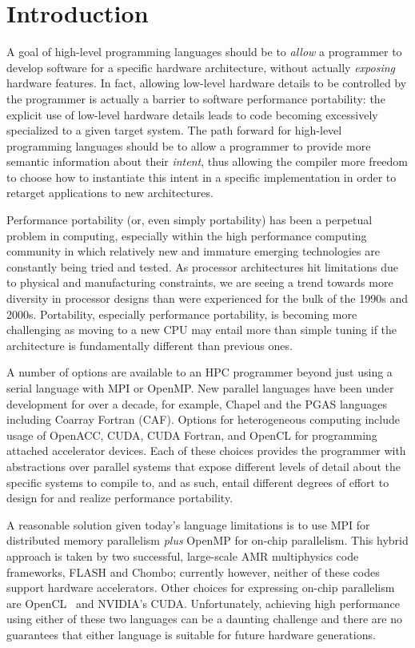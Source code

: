 \section{Introduction}

A goal of high-level programming languages should be to \emph{allow} a programmer to
develop software for a specific hardware architecture, without actually \emph{exposing} hardware
features.  In fact, allowing low-level hardware details to be controlled by the programmer is actually
a barrier to software performance portability: the explicit use of low-level hardware details 
leads to code becoming excessively specialized to a given target system.  The path forward for high-level
programming languages should be to allow a programmer to provide more semantic information
about their \emph{intent}, thus allowing the compiler more freedom to choose how to instantiate this
intent in a specific implementation in order to retarget applications to new architectures.

Performance portability (or, even simply portability) has been a perpetual problem in computing,
especially within the high performance computing community in which relatively new and immature
emerging technologies are constantly being tried and tested.  As processor architectures hit limitations due
to physical and manufacturing constraints, we are seeing a trend towards more diversity in
processor designs than were experienced for the bulk of the 1990s and 2000s.  Portability, especially
performance portability, is becoming more challenging as moving to a new CPU may entail more than simple
tuning if the architecture is fundamentally different than previous ones.

A number of options are available to an HPC programmer beyond just using a serial
language with MPI or OpenMP.  New parallel languages have been under development for over a decade, 
for example, Chapel and the PGAS languages including Coarray Fortran (CAF).  Options for 
heterogeneous computing
include usage of OpenACC, CUDA, CUDA Fortran, and OpenCL for programming attached
accelerator devices.  Each of these choices provides the programmer with abstractions over parallel
systems that expose different levels of detail about the specific systems to compile to, and as such,
entail different degrees of effort to design for and realize performance portability.

A reasonable solution given today's language limitations is to use MPI for distributed memory
parallelism \emph{plus} OpenMP for on-chip parallelism.  This hybrid approach is taken by two
successful, large-scale AMR multiphysics code frameworks, FLASH and Chombo; currently however,
neither of these codes support hardware accelerators\cite{DBLP:journals/corr/DubeyS13}.
Other choices for expressing on-chip parallelism are OpenCL~\cite{opencl11} and NVIDIA's CUDA.
Unfortunately, achieving high performance using either of these two languages can be a daunting
challenge and there are no guarantees that either language is suitable for future hardware
generations.  

